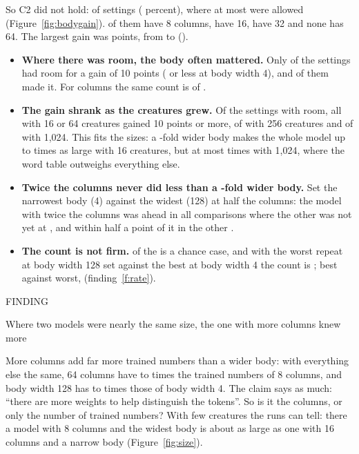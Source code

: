 \documentclass[10pt,letterpaper]{article}
\newcommand{\smallcaps}[1]{{\sffamily\fontsize{7.6}{9}\selectfont\color{second}\addfontfeature{LetterSpace=7}#1}}
\newcommand{\labelled}[2]{%
  \vspace{12pt plus 3pt minus 2pt}%
  \smallcaps{#1}\par\nopagebreak\vspace{-2pt}%
  {\sffamily\bfseries\fontsize{12.5}{15.5}\selectfont\raggedright #2\par}%
  \nopagebreak\vspace{1pt}}
\newcounter{finding}
\newcommand{\finding}[1]{\refstepcounter{finding}\labelled{FINDING \thefinding}{#1}}
\newcommand{\lead}[1]{\textbf{#1}}               %
\begin{document}
So C2 did not hold: \CTwoGained{} of \CTwoCases{} settings (\CTwoPercent{} percent), where at most
\CTwoAllowed{} were allowed (Figure~\ref{fig:bodygain}). \CTwoAtEightCap{} of them have 8 columns,
\CTwoAtSixteen{} have 16, \CTwoAtThirtyTwo{} have 32 and none has 64. The largest gain was \CTwoLargest{}
points, from \CTwoLargestFrom{} to \CTwoLargestTo{} (\CTwoLargestWhere).

\begin{itemize}
\item \lead{Where there was room, the body often mattered.} Only \CTwoRoom{} of the \CTwoCases{} settings had
      room for a gain of 10 points (\RoomBar{} or less at body width 4), and \CTwoGained{} of them made it.
      For columns the same count is \COneRoom{} of \COneRoom.
\item \lead{The gain shrank as the creatures grew.} Of the settings with room, all \CTwoRoomFew{} with 16 or
      64 creatures gained 10 points or more, \CTwoRoomMidGained{} of \CTwoRoomMid{} with 256 creatures and
      \CTwoRoomManyGained{} of \CTwoRoomMany{} with 1,024. This fits the sizes: a \BodyTimes-fold wider body
      makes the whole model up to \BodyFewHigh{} times as large with 16 creatures, but at most \BodyManyHigh{}
      times with 1,024, where the word table outweighs everything else.
\item \lead{Twice the columns never did less than a \BodyTimes-fold wider body.} Set the narrowest body (4)
      against the widest (128) at half the columns: the model with twice the columns was ahead in all
      \DoubledMore{} comparisons where the other was not yet at \LearnedBar, and within half a point of it in
      the other \DoubledTied.
\item \lead{The count is not firm.} \CTwoByChanceCap{} of the \CTwoGained{} is a chance case, and with the worst
      repeat at body width 128 set against the best at body width 4 the count is \CTwoRunLow; best against
      worst, \CTwoRunHigh{} (finding~\ref{f:rate}).
\end{itemize}

\finding{Where two models were nearly the same size, the one with more columns knew more}\label{f:size}

More columns add far more trained numbers than a wider body: with everything else the same, 64 columns have
\SizeGridLow{} to \SizeGridHigh{} times the trained numbers of 8 columns, and body width 128 has \BodyGridLow{}
to \BodyGridHigh{} times those of body width 4. The claim says as much: ``there are more weights to help
distinguish the tokens''. So is it the columns, or only the number of trained numbers? With few creatures the
runs can tell: there a model with 8 columns and the widest body is about as large as one with 16 columns and a
narrow body (Figure~\ref{fig:size}).
\end{document}

